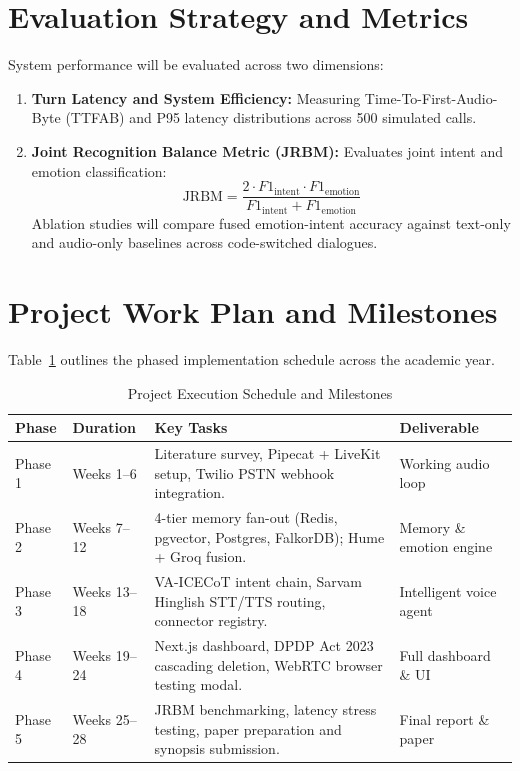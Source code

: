 \documentclass[12pt,a4paper]{article}
\begin{document}
\section{Evaluation Strategy and Metrics}
System performance will be evaluated across two dimensions:
\begin{enumerate}[leftmargin=*]
    \item \textbf{Turn Latency and System Efficiency:} Measuring Time-To-First-Audio-Byte (TTFAB) and P95 latency distributions across 500 simulated calls.
    \item \textbf{Joint Recognition Balance Metric (JRBM):} Evaluates joint intent and emotion classification:
    \begin{equation}
    \text{JRBM} = \frac{2 \cdot F1_{\text{intent}} \cdot F1_{\text{emotion}}}{F1_{\text{intent}} + F1_{\text{emotion}}}
    \end{equation}
    Ablation studies will compare fused emotion-intent accuracy against text-only and audio-only baselines across code-switched dialogues.
\end{enumerate}

\section{Project Work Plan and Milestones}
Table~\ref{tab:milestones} outlines the phased implementation schedule across the academic year.

\begin{table}[H]
\centering
\caption{Project Execution Schedule and Milestones}
\label{tab:milestones}
\footnotesize
\begin{tabularx}{\textwidth}{@{}l p{3.2cm} p{7.0cm} X@{}}
\toprule
\textbf{Phase} & \textbf{Duration} & \textbf{Key Tasks} & \textbf{Deliverable} \\
\midrule
Phase 1 & Weeks 1--6 & Literature survey, Pipecat + LiveKit setup, Twilio PSTN webhook integration. & Working audio loop \\
Phase 2 & Weeks 7--12 & 4-tier memory fan-out (Redis, pgvector, Postgres, FalkorDB); Hume + Groq fusion. & Memory \& emotion engine \\
Phase 3 & Weeks 13--18 & VA-ICECoT intent chain, Sarvam Hinglish STT/TTS routing, connector registry. & Intelligent voice agent \\
Phase 4 & Weeks 19--24 & Next.js dashboard, DPDP Act 2023 cascading deletion, WebRTC browser testing modal. & Full dashboard \& UI \\
Phase 5 & Weeks 25--28 & JRBM benchmarking, latency stress testing, paper preparation and synopsis submission. & Final report \& paper \\
\bottomrule
\end{tabularx}
\end{table}
\end{document}
